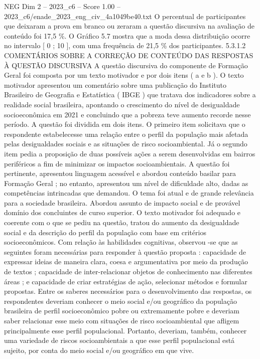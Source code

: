 \begin{textsample}{NEG Dim 2 – 2023\_c6 – Score 1.00 – 2023\_c6/enade\_2023\_eng\_civ\_4a1049be40.txt}
O percentual de participantes que deixaram a prova em branco ou zeraram a questão discursiva na avaliação de conteúdo foi 17,5 \%.
O Gráfico 5.7 mostra que a moda dessa distribuição ocorre no intervalo [ 0 ; 10 ], com uma frequência de 21,5 \% dos participantes. 5.3.1.2 COMENTÁRIOS SOBRE A CORREÇÃO DE CONTEÚDO DAS RESPOSTAS À QUESTÃO DISCURSIVA A questão discursiva do componente de Formação Geral foi composta por um texto motivador e por dois itens ( a e b ).
O texto motivador apresentou um comentário sobre uma publicação do Instituto Brasileiro de Geografia e Estatística ( IBGE ) que tratava dos indicadores sobre a realidade social brasileira, apontando o crescimento do nível de desigualdade socioeconômica em 2021 e concluindo que a pobreza teve aumento recorde nesse período.
A questão foi dividida em dois itens.
O primeiro item solicitava que o respondente estabelecesse uma relação entre o perfil da população mais afetada pelas desigualdades sociais e as situações de risco socioambiental.
Já o segundo item pedia a proposição de duas possíveis ações a serem desenvolvidas em bairros periféricos a fim de minimizar os impactos socioambientais.
A questão foi pertinente, apresentou linguagem acessível e abordou conteúdo basilar para Formação Geral ; no entanto, apresentou um nível de dificuldade alto, dadas as competências intrincadas que demandou.
O tema foi atual e de grande relevância para a sociedade brasileira.
Abordou assunto de impacto social e de provável domínio dos concluintes de curso superior.
O texto motivador foi adequado e coerente com o que se pediu na questão, tratou do aumento da desigualdade social e da descrição do perfil da população com base em critérios socioeconômicos.
Com relação às habilidades cognitivas, observou -se que as seguintes foram necessárias para responder à questão proposta : capacidade de expressar ideias de maneira clara, coesa e argumentativa por meio da produção de textos ; capacidade de inter-relacionar objetos de conhecimento nas diferentes áreas ; e capacidade de criar estratégias de ação, selecionar métodos e formular propostas.
Entre os saberes necessários para o desenvolvimento das respostas, os respondentes deveriam conhecer o meio social e/ou geográfico da população brasileira de perfil socioeconômico pobre ou extremamente pobre e deveriam saber relacionar esse meio com situações de risco socioambiental que afligem principalmente esse perfil populacional.
Portanto, deveriam, também, conhecer uma variedade de riscos socioambientais a que esse perfil populacional está sujeito, por conta do meio social e/ou geográfico em que vive.

\end{textsample}

